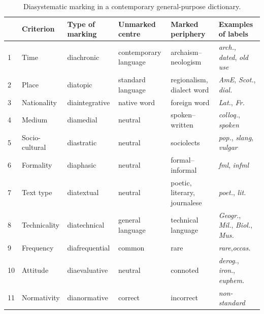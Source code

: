 \begin{table}[h!]
    \centering
    \small
    { \RaggedRight
    \begin{tabular}{p{0.05in}lp{0.8in}p{0.8in}p{0.75in}p{0.95in}}
    \toprule
        & \textbf{Criterion} & \textbf{Type of marking} & \textbf{Unmarked centre} & \textbf{Marked periphery} & \textbf{Examples of labels} \\
    \midrule
1 & 
Time & 
diachronic & 
contemporary language & 
archaism--neologism & 
\textit{arch.}, \textit{dated}, \textit{old use} \\ \hline
2 &
Place &
diatopic &
standard language &
regionalism, dialect word &
\textit{AmE}, \textit{Scot.}, \textit{dial.} \\ \hline
3 &
Nationality &
diaintegrative &
native word &
foreign word &
\textit{Lat.}, \textit{Fr.} \\ \hline
4 &
Medium &
diamedial &
neutral &
spoken--written &
\textit{colloq.}, \textit{spoken} \\ \hline
5 &
Socio-cultural &
diastratic &
neutral &
sociolects &
\textit{pop.}, \textit{slang}, \textit{vulgar} \\ \hline
6 &
Formality &
diaphasic &
neutral &
formal--informal &
\textit{fml}, \textit{infml} \\ \hline
7 &
Text type &
diatextual &
neutral &
poetic, literary, journalese &
\textit{poet.}, \textit{lit.} \\ \hline
8 &
Technicality &
diatechnical &
general language &
technical language &
\textit{Geogr.}, \textit{Mil.}, \textit{Biol.}, \textit{Mus.} \\ \hline
9 &
Frequency &
diafrequential &
common &
rare &
\textit{rare},\newline \textit{occas.} \\ \hline
10 &
Attitude &
diaevaluative &
neutral &
connoted &
\textit{derog.}, \textit{iron}., \textit{euphem.} \\  \hline
11 &
Normativity &
dianormative &
correct &
incorrect &
\textit{non-standard} \\
    \midrule
    \end{tabular}
    }
    \caption[]{\label{table:Stolk_thes-content:diasystematic-marking}Diasystematic marking in a contemporary general-purpose dictionary.\protect\footnotemark}
\end{table}


